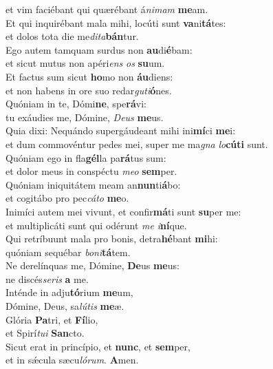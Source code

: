 \evenverse et vim faciébant qui quærébant á\textit{ni}\textit{mam} \textbf{me}am.\\
\oddverse Et qui inquirébant mala mihi, locúti sunt \textbf{va}ni\textbf{tá}tes:~\*\\
\oddverse et dolos tota die me\textit{di}\textit{ta}\textbf{bán}tur.\\
\evenverse Ego autem tamquam surdus non \textbf{au}di\textbf{é}bam:~\*\\
\evenverse et sicut mutus non apéri\textit{ens} \textit{os} \textbf{su}um.\\
\oddverse Et factus sum sicut \textbf{ho}mo non \textbf{áu}diens:~\*\\
\oddverse et non habens in ore suo redar\textit{gu}\textit{ti}\textbf{ó}nes.\\
\evenverse Quóniam in te, Dómi\textbf{ne}, spe\textbf{rá}vi:~\*\\
\evenverse tu exáudies me, Dómine, \textit{De}\textit{us} \textbf{me}us.\\
\oddverse Quia dixi: Nequándo supergáudeant mihi ini\textbf{mí}ci \textbf{me}i:~\*\\
\oddverse et dum commovéntur pedes mei, super me ma\textit{gna} \textit{lo}\textbf{cú}\textbf{ti} sunt.\\
\evenverse Quóniam ego in fla\textbf{gél}la pa\textbf{rá}tus sum:~\*\\
\evenverse et dolor meus in conspéctu \textit{me}\textit{o} \textbf{sem}per.\\
\oddverse Quóniam iniquitátem meam an\textbf{nun}ti\textbf{á}bo:~\*\\
\oddverse et cogitábo pro pec\textit{cá}\textit{to} \textbf{me}o.\\
\evenverse Inimíci autem mei vivunt, et confir\textbf{má}ti sunt \textbf{su}per me:~\*\\
\evenverse et multiplicáti sunt qui odérunt \textit{me} \textit{i}\textbf{ní}que.\\
\oddverse Qui retríbuunt mala pro bonis, detra\textbf{hé}bant \textbf{mi}hi:~\*\\
\oddverse quóniam sequébar \textit{bo}\textit{ni}\textbf{tá}tem.\\
\evenverse Ne derelínquas me, Dómine, \textbf{De}us \textbf{me}us:~\*\\
\evenverse ne discés\textit{se}\textit{ris} \textbf{a} me.\\
\oddverse Inténde in adju\textbf{tó}rium \textbf{me}um,~\*\\
\oddverse Dómine, Deus, sa\textit{lú}\textit{tis} \textbf{me}æ.\\
\evenverse Glória \textbf{Pa}tri, et \textbf{Fí}lio,~\*\\
\evenverse et Spirí\textit{tu}\textit{i} \textbf{San}cto.\\
\oddverse Sicut erat in princípio, et \textbf{nunc}, et \textbf{sem}per,~\*\\
\oddverse et in sǽcula sæcu\textit{ló}\textit{rum}. \textbf{A}men.\\
